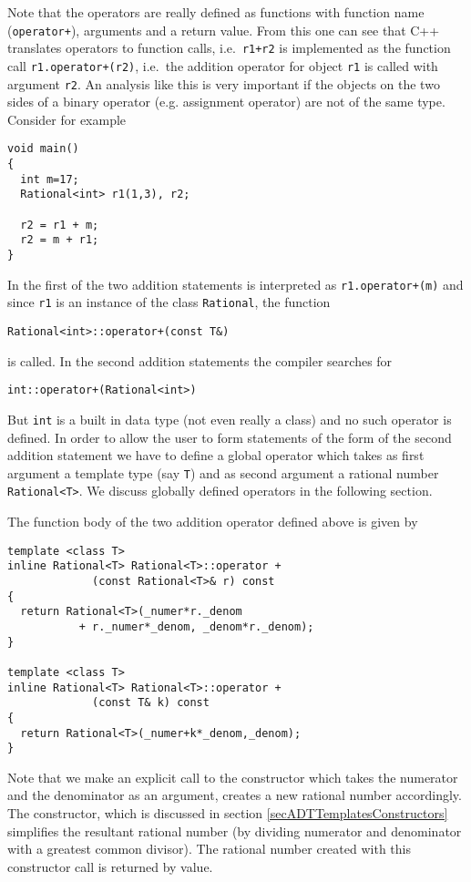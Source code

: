 Note that the operators are really defined as functions with function
name (\verb&operator+&), arguments and a return value. From this
one can see that C++ translates operators to function calls, i.e.\
\verb&r1+r2& is implemented as the function call \verb&r1.operator+(r2)&,
i.e.\ the addition operator for object \verb+r1+ is called with
argument \verb+r2+. An analysis like this is very important if the
objects on the two sides of a binary operator (e.g. assignment
operator) are not of the same type.
Consider for example
{\footnotesize \begin{verbatim}
void main()
{
  int m=17;
  Rational<int> r1(1,3), r2;

  r2 = r1 + m;
  r2 = m + r1;
}
\end{verbatim}}
In the first of the two addition statements is interpreted as
\verb&r1.operator+(m)& and since \verb+r1+ is an instance 
of the class \verb+Rational+, the function
{\footnotesize \begin{verbatim}
Rational<int>::operator+(const T&)
\end{verbatim}}
\noindent
is called. In the second addition statements the compiler
searches for
{\footnotesize \begin{verbatim}
int::operator+(Rational<int>)
\end{verbatim}}
But \verb+int+ is a built in data type (not even really a class)
and no such operator is defined. In order to allow the user to
form statements of the form of the second addition statement
we have to define a global operator which takes as first
argument a template type (say \verb+T+) and as second argument
a rational number \verb+Rational<T>+. We discuss globally defined
operators in the following section.

The function body of the two addition operator defined above
is given by
{\footnotesize \begin{verbatim}
template <class T>
inline Rational<T> Rational<T>::operator +
             (const Rational<T>& r) const
{
  return Rational<T>(_numer*r._denom
           + r._numer*_denom, _denom*r._denom);
}

template <class T>
inline Rational<T> Rational<T>::operator +
             (const T& k) const
{
  return Rational<T>(_numer+k*_denom,_denom);
}
\end{verbatim}}
Note that we make an explicit call to the constructor
which takes the numerator and the denominator as an
argument, creates a new rational number accordingly.
The constructor, which is discussed in section
\ref{secADTTemplatesConstructors} simplifies the resultant rational
number (by dividing numerator and denominator with
a greatest common divisor). The rational number
created with this constructor call is returned by value.

